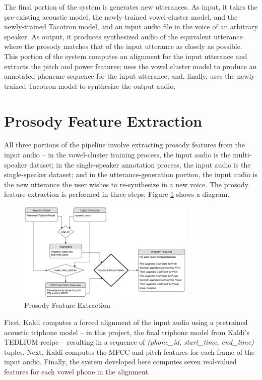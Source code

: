 \documentclass{article}
\begin{document}
The final portion of the system is generates new utterances. As input, it takes the pre-existing acoustic model, the newly-trained vowel-cluster model, and the newly-trained Tacotron model, and an input audio file in the voice of an arbitrary speaker. As output, it produces synthesized audio of the equivalent utterance where the prosody matches that of the input utterance as closely as possible. This portion of the system computes an alignment for the input utterance and extracts the pitch and power features; uses the vowel cluster model to produce an annotated phoneme sequence for the input utterance; and, finally, uses the newly-trained Tacotron model to synthesize the output audio.

\section{Prosody Feature Extraction}
\label{sec:prosody}

All three portions of the pipeline involve extracting prosody features from the input audio -- in the vowel-cluster training process, the input audio is the multi-speaker dataset; in the single-speaker annotation process, the input audio is the single-speaker dataset; and in the utterance-generation portion, the input audio is the new utterance the user wishes to re-synthesize in a new voice.
The prosody feature extraction is performed in three steps; Figure \ref{fig:prosodyextraction} shows a diagram.

\begin{figure}[htb]

\begin{minipage}[b]{1.0\linewidth}
  \centering
  \centerline{\includegraphics[width=8.5cm]{Prosody_Extraction.png}}
\end{minipage}
\caption{Prosody Feature Extraction}
\label{fig:prosodyextraction}
\end{figure}

First, Kaldi computes a forced alignment of the input audio using a pretrained acoustic triphone model -- in this project, the final triphone model from Kaldi's TEDLIUM recipe -- resulting in a sequence of \textit{(phone\_id, start\_time, end\_time)} tuples.
Next, Kaldi computes the MFCC and pitch features for each frame of the input audio. Finally, the system developed here computes seven real-valued features for each vowel phone in the alignment.
\end{document}
